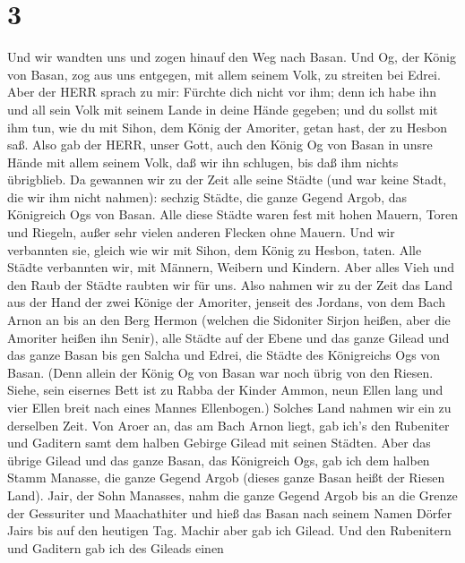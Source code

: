\hypertarget{section-2}{%
\section{3}\label{section-2}}

 Und wir wandten uns und zogen hinauf den Weg nach Basan.
Und Og, der König von Basan, zog aus uns entgegen, mit allem seinem
Volk, zu streiten bei Edrei.  Aber der HERR sprach zu mir:
Fürchte dich nicht vor ihm; denn ich habe ihn und all sein Volk mit
seinem Lande in deine Hände gegeben; und du sollst mit ihm tun, wie du
mit Sihon, dem König der Amoriter, getan hast, der zu Hesbon saß.
 Also gab der HERR, unser Gott, auch den König Og von Basan
in unsre Hände mit allem seinem Volk, daß wir ihn schlugen, bis daß ihm
nichts übrigblieb.  Da gewannen wir zu der Zeit alle seine
Städte (und war keine Stadt, die wir ihm nicht nahmen): sechzig Städte,
die ganze Gegend Argob, das Königreich Ogs von Basan.  Alle
diese Städte waren fest mit hohen Mauern, Toren und Riegeln, außer sehr
vielen anderen Flecken ohne Mauern.  Und wir verbannten sie,
gleich wie wir mit Sihon, dem König zu Hesbon, taten. Alle Städte
verbannten wir, mit Männern, Weibern und Kindern.  Aber
alles Vieh und den Raub der Städte raubten wir für uns. 
Also nahmen wir zu der Zeit das Land aus der Hand der zwei Könige der
Amoriter, jenseit des Jordans, von dem Bach Arnon an bis an den Berg
Hermon  (welchen die Sidoniter Sirjon heißen, aber die
Amoriter heißen ihn Senir),  alle Städte auf der Ebene und
das ganze Gilead und das ganze Basan bis gen Salcha und Edrei, die
Städte des Königreichs Ogs von Basan.  (Denn allein der
König Og von Basan war noch übrig von den Riesen. Siehe, sein eisernes
Bett ist zu Rabba der Kinder Ammon, neun Ellen lang und vier Ellen breit
nach eines Mannes Ellenbogen.)  Solches Land nahmen wir ein
zu derselben Zeit. Von Aroer an, das am Bach Arnon liegt, gab ich's den
Rubeniter und Gaditern samt dem halben Gebirge Gilead mit seinen
Städten.  Aber das übrige Gilead und das ganze Basan, das
Königreich Ogs, gab ich dem halben Stamm Manasse, die ganze Gegend Argob
(dieses ganze Basan heißt der Riesen Land).  Jair, der Sohn
Manasses, nahm die ganze Gegend Argob bis an die Grenze der Gessuriter
und Maachathiter und hieß das Basan nach seinem Namen Dörfer Jairs bis
auf den heutigen Tag.  Machir aber gab ich Gilead.
 Und den Rubenitern und Gaditern gab ich des Gileads einen
